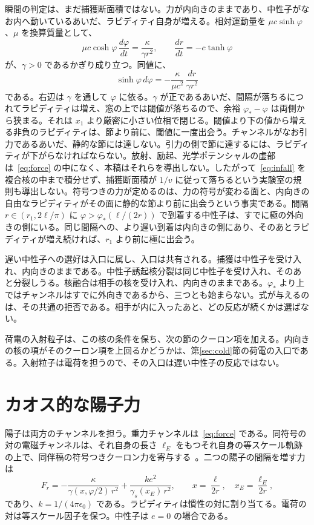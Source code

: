 \documentclass[a4paper]{article}
\begin{document}
瞬間の判定は、まだ捕獲断面積ではない。力が内向きのままであり、中性子がなお内へ動いているあいだ、ラピディティ自身が増える。相対運動量を \(\mu c\sinh\varphi\)、\(\mu\) を換算質量として、
\begin{equation}
\label{eq:infall}
\mu c\cosh\varphi\,\frac{d\varphi}{dt}
  =\frac{\kappa}{\gamma r^{2}},
\qquad
\frac{dr}{dt}=-c\tanh\varphi
\end{equation}
が、\(\gamma>0\) であるかぎり成り立つ。同値に、
\[
\sinh\varphi\,d\varphi
  =-\frac{\kappa}{\mu c^{2}}\,\frac{dr}{\gamma r^{2}}
\]
である。右辺は \(\gamma\) を通して \(\varphi\) に依る。\(\gamma\) が正であるあいだ、間隔が落ちるにつれてラピディティは増え、窓の上では閾値が落ちるので、余裕 \(\varphi_*-\varphi\) は両側から狭まる。それは \(x_1\) より厳密に小さい位相で閉じる。閾値より下の値から増える非負のラピディティは、節より前に、閾値に一度出会う。チャンネルがなお引力であるあいだ、静的な節には達しない。引力の側で節に達するには、ラピディティが下がらなければならない。放射、励起、光学ポテンシャルの虚部は~\eqref{eq:force} の中になく、本稿はそれらを導出しない。したがって~\eqref{eq:infall} を複合核の中まで積分せず、捕獲断面積が \(1/v\) に従って落ちるという実験室の規則も導出しない。符号つきの力が定めるのは、力の符号が変わる面と、内向きの自由なラピディティがその面に静的な節より前に出会うという事実である。間隔 \(r\in(r_1,2\ell/\pi)\) に \(\varphi>\varphi_*(\ell/(2r))\) で到着する中性子は、すでに極の外向きの側にいる。同じ間隔への、より遅い到着は内向きの側にあり、そのあとラピディティが増え続ければ、\(r_1\) より前に極に出会う。

遅い中性子への選好は入口に属し、入口は共有される。捕獲は中性子を受け入れ、内向きのままである。中性子誘起核分裂は同じ中性子を受け入れ、そのあと分裂しうる。核融合は相手の核を受け入れ、内向きのままである。\(\varphi_*\) より上ではチャンネルはすでに外向きであるから、三つとも始まらない。式が与えるのは、その共通の拒否である。相手が内に入ったあと、どの反応が続くかは選ばない。

荷電の入射粒子は、この核の条件を保ち、次の節のクーロン項を加える。内向きの核の項がそのクーロン項を上回るかどうかは、第\ref{sec:cold}節の荷電の入口である。入射粒子は電荷を担うので、その入口は遅い中性子の反応ではない。

\section{カオス的な陽子力}
\label{sec:proton}

陽子は両方のチャンネルを担う。重力チャンネルは~\eqref{eq:force} である。同符号の対の電磁チャンネルは、それ自身の長さ \(\ell_E\) をもつそれ自身の等スケール軌跡の上で、同伴稿の符号つきクーロン力を寄与する~\cite{dst-shell}。二つの陽子の間隔を増す力は
\begin{equation}
\label{eq:two-channel}
F_r
  =-\frac{\kappa}{\gamma(x,\varphi/2)\,r^{2}}
  +\frac{k e^{2}}{\gamma_s(x_E)\,r^{2}},
\qquad
x=\frac{\ell}{2r},
\quad
x_E=\frac{\ell_E}{2r},
\end{equation}
であり、\(k=1/(4\pi\epsilon_0)\) である。ラピディティは慣性の対に割り当てる。電荷の対は等スケール因子を保つ。中性子は \(e=0\) の場合である。
\end{document}
